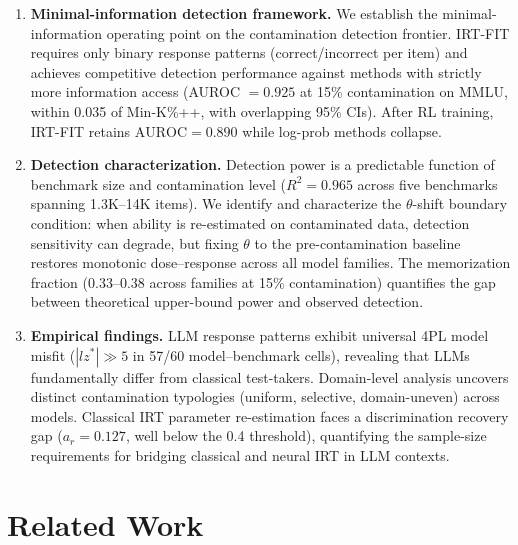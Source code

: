 \documentclass[11pt,a4paper]{article}
\begin{document}
\begin{enumerate}
\item \textbf{Minimal-information detection framework.}
We establish the minimal-information operating point on the contamination detection frontier.
IRT-FIT requires only binary response patterns (correct/incorrect per item) and achieves competitive detection performance against methods with strictly more information access (AUROC $= 0.925$ at 15\% contamination on MMLU, within 0.035 of Min-K\%++, with overlapping 95\% CIs).
After RL training, IRT-FIT retains $\text{AUROC} = 0.890$ while log-prob methods collapse.

\item \textbf{Detection characterization.}
Detection power is a predictable function of benchmark size and contamination level ($R^2 = 0.965$ across five benchmarks spanning 1.3K--14K items).
We identify and characterize the $\theta$-shift boundary condition: when ability is re-estimated on contaminated data, detection sensitivity can degrade, but fixing $\theta$ to the pre-contamination baseline restores monotonic dose--response across all model families.
The memorization fraction (0.33--0.38 across families at 15\% contamination) quantifies the gap between theoretical upper-bound power and observed detection.

\item \textbf{Empirical findings.}
LLM response patterns exhibit universal 4PL model misfit ($|lz^*| \gg 5$ in 57/60 model--benchmark cells), revealing that LLMs fundamentally differ from classical test-takers.
Domain-level analysis uncovers distinct contamination typologies (uniform, selective, domain-uneven) across models.
Classical IRT parameter re-estimation faces a discrimination recovery gap ($a_r = 0.127$, well below the 0.4 threshold), quantifying the sample-size requirements for bridging classical and neural IRT in LLM contexts.
\end{enumerate}


\section{Related Work}
\end{document}
